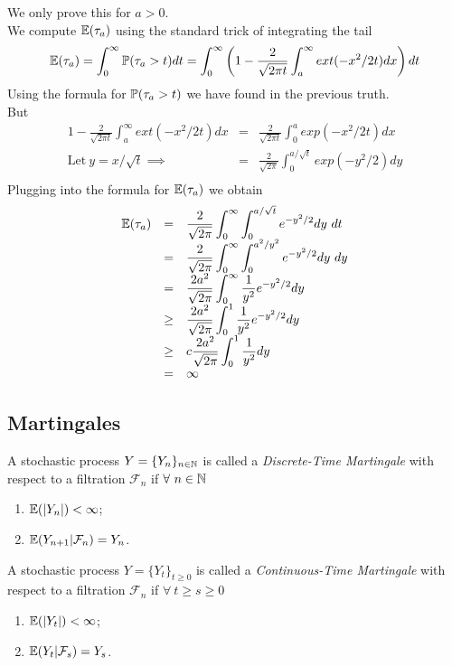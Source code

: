 \documentclass[11pt,a4paper]{article}
\begin{document}
We only prove this for $a>0$.\\
We compute $\mathbb{E}(\tau_a)$ using the standard trick of integrating the tail
$$\mathbb{E}(\tau_a)=\int_0^\infty\mathbb{P}(\tau_a>t)dt=\int_0^\infty\left(1-\frac{2}{\sqrt{2\pi t}}\int_a^\infty ext(-x^2/2t)dx\right)dt$$
Using the formula for $\mathbb{P}(\tau_a>t)$ we have found in the previous truth.\\
But
\[\begin{array}{rcl}
{\displaystyle1-\frac{2}{\sqrt{2\pi t}}\int_a^\infty ext(-x^2/2t)dx}&=&{\displaystyle\frac{2}{\sqrt{2\pi t}}\int_0^aexp(-x^2/2t)dx}\\
\mathrm{Let}\ y=x/\sqrt{t}\implies&=&{\displaystyle\frac{2}{\sqrt{2\pi}}\int_0^{a/\sqrt{t}}exp(-y^2/2)dy}\\
\end{array}\]
Plugging into the formula for $\mathbb{E}(\tau_a)$ we obtain
\[\begin{array}{rcl}
\expect(\tau_a)&=&{\displaystyle\frac{2}{\sqrt{2\pi}}\int_0^\infty\int_0^{a/\sqrt{t}}e^{-y^2/2}dy\ dt}\\
&=&{\displaystyle\frac{2}{\sqrt{2\pi}}\int_0^\infty\int_0^{a^2/y^2}e^{-y^2/2}dy\ dy}\\
&=&{\displaystyle\frac{2a^2}{\sqrt{2\pi}}\int_0^\infty\frac{1}{y^2}e^{-y^2/2}dy}\\
&\geq&{\displaystyle\frac{2a^2}{\sqrt{2\pi}}\int_0^1\frac{1}{y^2}e^{-y^2/2}dy}\\
&\geq&{\displaystyle c\frac{2a^2}{\sqrt{2\pi}}\int_0^1\frac{1}{y^2}dy}\\
&=&\infty
\end{array}\]

\subsection{Martingales}

A stochastic process $Y=\{Y_n\}_{n\in\mathbb{N}}$ is called a \textit{Discrete-Time Martingale} with respect to a filtration $\mathcal{F}_n$ if $\forall\ n\in\mathbb{N}$
\begin{enumerate}[label=\roman*)]
	\item $\mathbb{E}(|Y_n|)<\infty$;
	\item $\mathbb{E}(Y_{n+1}|\mathcal{F}_n)=Y_n$.
\end{enumerate}

A stochastic process $Y=\{Y_t\}_{t\geq0}$ is called a \textit{Continuous-Time Martingale} with respect to a filtration $\mathcal{F}_n$ if $\forall\ t\geq s\geq0$
\begin{enumerate}[label=\roman*)]
	\item $\mathbb{E}(|Y_t|)<\infty$;
	\item $\mathbb{E}(Y_t|\mathcal{F}_s)=Y_s$.
\end{enumerate}
\end{document}
